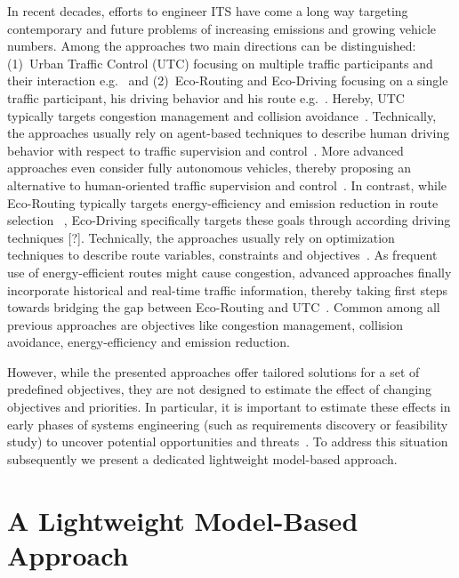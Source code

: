 \documentclass[conference]{../cls/IEEEtran}
\begin{document}
In recent decades, efforts to engineer ITS have come a long way targeting
contemporary and future problems of increasing emissions and growing vehicle
numbers. Among the approaches two main directions can be distinguished:
(1)~Urban Traffic Control (UTC) focusing on multiple traffic participants and
their interaction e.g.~\cite{Chen2010,Dresner2008} and (2)~Eco-Routing and
Eco-Driving focusing on a single traffic participant, his driving behavior and
his route e.g.~\cite{Ericsson2006,Boriboonsomsin2012}. Hereby, UTC typically targets
congestion management and collision avoidance~\cite{Chen2010}. Technically, the
approaches usually rely on agent-based techniques to describe human driving
behavior with respect to traffic supervision and control~\cite{Chen2010}. More
advanced approaches even consider fully autonomous vehicles, thereby proposing
an alternative to human-oriented traffic supervision and
control~\cite{Dresner2008}. In contrast, while Eco-Routing typically targets
energy-efficiency and emission reduction in route
selection ~\cite{Ericsson2006}, Eco-Driving specifically targets these goals
through according driving techniques [?].
Technically, the approaches usually rely on optimization techniques to describe route variables, constraints and objectives~\cite{Ericsson2006}. As frequent use of energy-efficient routes might cause congestion, advanced approaches finally incorporate historical and real-time traffic information, thereby taking first steps towards bridging the gap between Eco-Routing and UTC~\cite{Boriboonsomsin2012}. Common among all previous approaches are objectives like congestion management, collision avoidance, energy-efficiency and emission reduction.

However, while the presented approaches offer tailored solutions for a set of predefined objectives, they are not designed to estimate the effect of changing objectives and priorities. In particular, it is important to estimate these effects in early phases of systems engineering (such as requirements discovery or feasibility study) to uncover potential opportunities and threats~\cite{Whitten2005}. To address this situation subsequently we present a dedicated lightweight model-based approach.

\section{A Lightweight Model-Based Approach}
\label{sec:approach}
\end{document}
